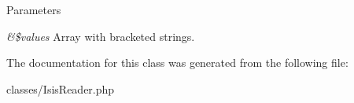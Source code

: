\begin{DoxyParams}{Parameters}
\item[{\em \&\$values}]Array with bracketed strings. \end{DoxyParams}


The documentation for this class was generated from the following file:\begin{DoxyCompactItemize}
\item 
classes/IsisReader.php\end{DoxyCompactItemize}
